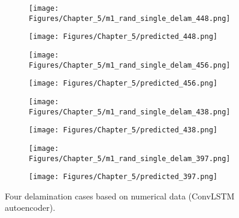 \begin{figure} [!h]
	\centering
	\begin{subfigure}[b]{.48\textwidth}
		\centering
		\texttt{[image: Figures/Chapter\_5/m1\_rand\_single\_delam\_448.png]}
		\caption{}
		\label{fig:RMS_448}
	\end{subfigure}
	\hfill
	\begin{subfigure}[b]{.48\textwidth}
		\centering
		\texttt{[image: Figures/Chapter\_5/predicted\_448.png]}
		\caption{}
		\label{fig:convlstm_pred_448}	
	\end{subfigure}
	\hfill
	\begin{subfigure}[b]{.48\textwidth}
		\centering
		\texttt{[image: Figures/Chapter\_5/m1\_rand\_single\_delam\_456.png]}
		\caption{}
		\label{fig:RMS_456}
	\end{subfigure}
	\hfill
	\begin{subfigure}[b]{.48\textwidth}
		\centering
		\texttt{[image: Figures/Chapter\_5/predicted\_456.png]}
		\caption{}
		\label{fig:convlstm_pred_456}	
	\end{subfigure}
	\hfill
	\begin{subfigure}[b]{.48\textwidth}
		\centering
		\texttt{[image: Figures/Chapter\_5/m1\_rand\_single\_delam\_438.png]}
		\caption{}
		\label{fig:RMS_438}
	\end{subfigure}
	\hfill
	\begin{subfigure}[b]{.48\textwidth}
		\centering
		\texttt{[image: Figures/Chapter\_5/predicted\_438.png]}
		\caption{}
		\label{fig:convlstm_pred_438}	
	\end{subfigure}
	\hfill
	\begin{subfigure}[b]{.48\textwidth}
		\centering
		\texttt{[image: Figures/Chapter\_5/m1\_rand\_single\_delam\_397.png]}
		\caption{}
		\label{fig:RMS_397}
	\end{subfigure}
	\hfill
	\begin{subfigure}[b]{.48\textwidth}
		\centering
		\texttt{[image: Figures/Chapter\_5/predicted\_397.png]}
		\caption{}
		\label{fig:convlstm_pred_397}	
	\end{subfigure}
	\caption{Four delamination cases based on numerical data (ConvLSTM autoencoder).}
	\label{fig:Num_convlstm__case}
\end{figure}
\clearpage

